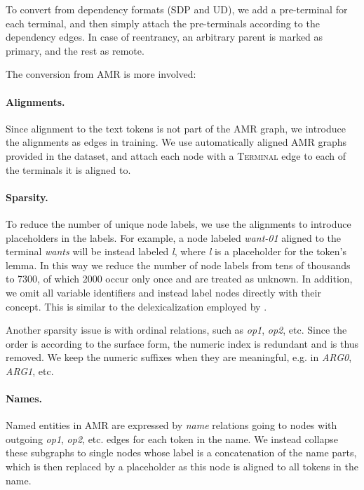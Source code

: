 \documentclass[11pt,a4paper]{article}
\begin{document}
To convert from dependency formats (SDP and UD), we add a pre-terminal for each terminal,
and then simply attach the pre-terminals according to the dependency edges.
In case of reentrancy, an arbitrary parent is marked as primary, and the rest as remote.

The conversion from AMR is more involved:

\paragraph{Alignments.}
Since alignment to the text tokens is not part of the AMR graph,
we introduce the alignments as edges in training.
We use automatically aligned AMR graphs provided in the dataset,
and attach each node with a \textsc{Terminal} edge to each of the terminals it is aligned to.

\paragraph{Sparsity.}
To reduce the number of unique node labels, we use the alignments to introduce
placeholders in the labels.
For example, a node labeled \textit{want-01} aligned to the terminal \textit{wants} will
be instead labeled \textit{\textlangle l},
where \textit{\textlangle l\textrangle} is a placeholder for the token's lemma.
In this way we reduce the number of node labels from tens of thousands to 7300,
of which 2000 occur only once and are treated as unknown.
In addition, we omit all variable identifiers and instead label nodes directly with their concept.
This is similar to the delexicalization employed by \citet{buys2017oxford}.

Another sparsity issue is with ordinal relations, such as \textit{op1}, \textit{op2}, etc.
Since the order is according to the surface form, the numeric index is redundant and is thus removed.
We keep the numeric suffixes when they are meaningful, e.g. in \textit{ARG0}, \textit{ARG1}, etc.

\paragraph{Names.}
Named entities in AMR are expressed by \textit{name} relations going to nodes with outgoing
\textit{op1}, \textit{op2}, etc. edges for each token in the name.
We instead collapse these subgraphs to single nodes whose label is a concatenation of the
name parts, which is then replaced by a placeholder as this node is aligned to all tokens in the name.
\end{document}
